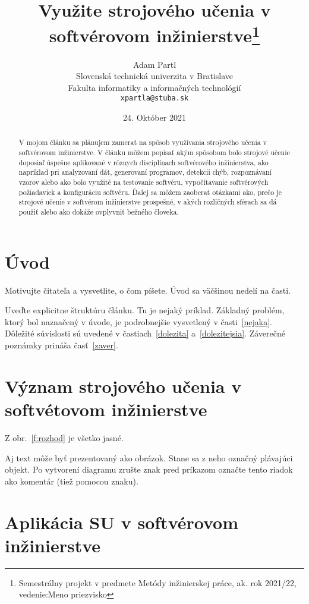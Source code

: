 \documentclass[10pt,twoside,slovak,a4paper]{article}
\title{Využite strojového učenia v softvérovom inžinierstve\thanks{Semestrálny projekt v predmete Metódy inžinierskej práce, ak. rok 2021/22, vedenie:Meno priezvisko}} %
\author{Adam Partl\\[2pt]
	{\small Slovenská technická univerzita v Bratislave}\\
	{\small Fakulta informatiky a informačných technológií}\\
	{\small \texttt{xpartla@stuba.sk}}
	}
\date{\small 24. Október 2021} %
\begin{document}
\maketitle

\begin{abstract}
V mojom článku sa plánujem zamerať na spôsob využívania strojového učenia v softvérovom 
inžinierstve. V článku môžem popísať akým spôsobom bolo strojové učenie doposiaľ úspešne 
aplikované v rôznych disciplínach softvérového inžinierstva, ako napríklad pri analyzovaní dát, 
generovaní programov, detekcii chýb, rozpoznávaní vzorov alebo ako bolo využité na testovanie 
softvéru, vypočítavanie softvérových požiadaviek a konfiguráciu softvéru. Ďalej sa môžem zaoberať 
otázkami ako, prečo je strojové učenie v softvérom inžinierstve prospešné, v akých rozličných sférach 
sa dá použiť alebo ako dokáže ovplyvniť bežného človeka.
\end{abstract}



\section{Úvod}

Motivujte čitateľa a vysvetlite, o čom píšete. Úvod sa väčšinou nedelí na časti.

Uveďte explicitne štruktúru článku. Tu je nejaký príklad.
Základný problém, ktorý bol naznačený v úvode, je podrobnejšie vysvetlený v časti~\ref{nejaka}.
Dôležité súvislosti sú uvedené v častiach~\ref{dolezita} a~\ref{dolezitejsia}.
Záverečné poznámky prináša časť~\ref{zaver}.



\section{Význam strojového učenia v softvétovom inžinierstve} \label{vyznam}

Z obr.~\ref{f:rozhod} je všetko jasné. 


Aj text môže byť prezentovaný ako obrázok. Stane sa z neho označný plávajúci objekt. Po vytvorení diagramu zrušte znak pred príkazom označte tento riadok ako komentár (tiež pomocou znaku).




\section{Aplikácia SU v softvérovom inžinierstve} \label{aplikacia}
\end{document}
